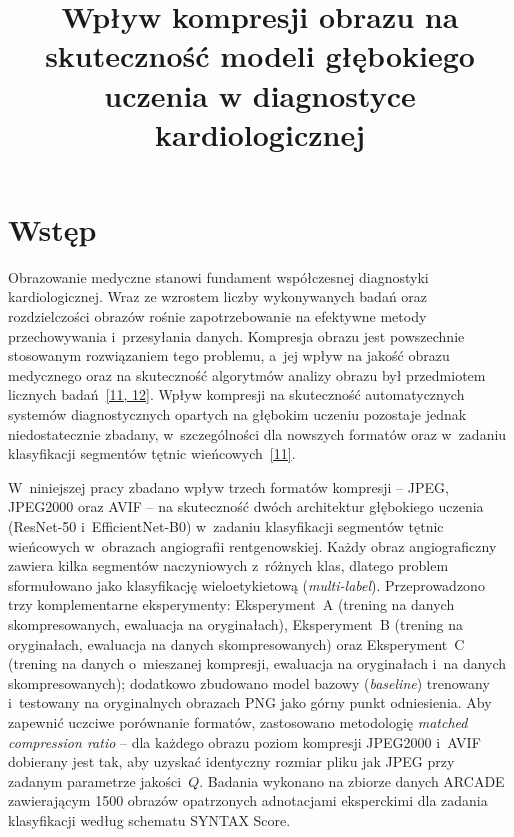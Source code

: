 \documentclass[12pt,a4paper]{article}
\title{Wpływ kompresji obrazu na skuteczność modeli głębokiego uczenia w diagnostyce kardiologicznej}
\author{}
\date{}
\newcommand{\mycite}[1]{\hyperlink{bib#1}{[#1]}}
\begin{document}
\maketitle

\section{Wstęp}

Obrazowanie medyczne stanowi fundament współczesnej diagnostyki kardiologicznej. Wraz ze wzrostem liczby wykonywanych badań oraz rozdzielczości obrazów rośnie zapotrzebowanie na efektywne metody przechowywania i~przesyłania danych. Kompresja obrazu jest powszechnie stosowanym rozwiązaniem tego problemu, a~jej wpływ na jakość obrazu medycznego oraz na skuteczność algorytmów analizy obrazu był przedmiotem licznych badań~\mycite{11, 12}. Wpływ kompresji na skuteczność automatycznych systemów diagnostycznych opartych na głębokim uczeniu pozostaje jednak niedostatecznie zbadany, w~szczególności dla nowszych formatów oraz w~zadaniu klasyfikacji segmentów tętnic wieńcowych~\mycite{11}.

W~niniejszej pracy zbadano wpływ trzech formatów kompresji -- JPEG, JPEG2000 oraz AVIF -- na skuteczność dwóch architektur głębokiego uczenia (ResNet-50 i~EfficientNet-B0) w~zadaniu klasyfikacji segmentów tętnic wieńcowych w~obrazach angiografii rentgenowskiej. Każdy obraz angiograficzny zawiera kilka segmentów naczyniowych z~różnych klas, dlatego problem sformułowano jako klasyfikację wieloetykietową (\textit{multi-label}). Przeprowadzono trzy komplementarne eksperymenty: Eksperyment~A (trening na danych skompresowanych, ewaluacja na oryginałach), Eksperyment~B (trening na oryginałach, ewaluacja na danych skompresowanych) oraz Eksperyment~C (trening na danych o~mieszanej kompresji, ewaluacja na oryginałach i~na danych skompresowanych); dodatkowo zbudowano model bazowy (\textit{baseline}) trenowany i~testowany na oryginalnych obrazach PNG jako górny punkt odniesienia. Aby zapewnić uczciwe porównanie formatów, zastosowano metodologię \textit{matched compression ratio} -- dla każdego obrazu poziom kompresji JPEG2000 i~AVIF dobierany jest tak, aby uzyskać identyczny rozmiar pliku jak JPEG przy zadanym parametrze jakości~$Q$. Badania wykonano na zbiorze danych ARCADE zawierającym 1500 obrazów opatrzonych adnotacjami eksperckimi dla zadania klasyfikacji według schematu SYNTAX Score.
\end{document}

